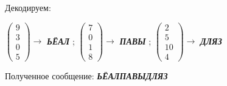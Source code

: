 \documentclass[a5paper, 10pt]{article}
\theoremstyle{definition}
\theoremstyle{plain}
\theoremstyle{remark}
\begin{document}
Декодируем:
\begin{center}
 $ \begin{pmatrix}
9\\
3\\
0\\
5
\end{pmatrix} \to$ \textbf{\textit{ЬЁАЛ}} ;
 $ \begin{pmatrix}
7\\
0\\
1\\
8
\end{pmatrix} \to$ \textbf{\textit{ПАВЫ}} ;
 $ \begin{pmatrix}
2\\
5\\
10\\
4
\end{pmatrix} \to$ \textbf{\textit{ДЛЯЗ}} 
 \\

\end{center}
Полученное сообщение:  \textbf{\textit{ЬЁАЛПАВЫДЛЯЗ}}
\end{document}
